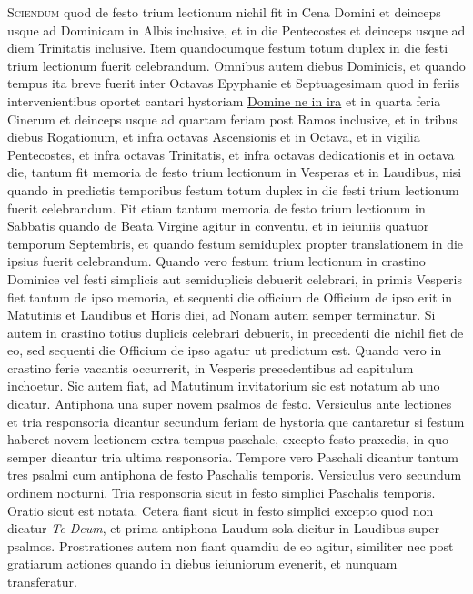 \begin{multicols*}{2}
{\color{Red} }
\lettrine[lines=2]{\zallmancaps \color{Blue} S}{ciendum} quod de festo trium lectionum nichil fit in Cena Domini et deinceps usque ad Dominicam in Albis inclusive, et in die Pentecostes et deinceps usque ad diem Trinitatis inclusive.
Item quandocumque festum totum duplex in die festi trium lectionum fuerit celebrandum.
Omnibus autem diebus Dominicis, et quando tempus ita breve fuerit inter Octavas Epyphanie et Septuagesimam quod in feriis intervenientibus oportet cantari hystoriam \hyperlink{domine-ne-in-ira}{Domine ne in ira} et in quarta feria Cinerum et deinceps usque ad quartam feriam post Ramos inclusive, et in tribus diebus Rogationum, et infra octavas Ascensionis et in Octava, et in vigilia Pentecostes, et infra octavas Trinitatis, et infra octavas dedicationis et in octava die, tantum fit memoria de festo trium lectionum in Vesperas et in Laudibus, nisi quando in predictis temporibus festum totum duplex in die festi trium lectionum fuerit celebrandum.
Fit etiam tantum memoria de festo trium lectionum in Sabbatis quando de Beata Virgine agitur in conventu, et in ieiuniis quatuor temporum Septembris, et quando festum semiduplex propter translationem in die ipsius fuerit celebrandum.
Quando vero festum trium lectionum in crastino Dominice vel festi simplicis aut semiduplicis debuerit celebrari, in primis Vesperis fiet tantum de ipso memoria, et sequenti die officium de Officium de ipso erit in Matutinis et Laudibus et Horis diei, ad Nonam autem semper terminatur.
Si autem in crastino totius duplicis celebrari debuerit, in precedenti die nichil fiet de eo, sed sequenti die Officium de ipso agatur ut predictum est.
Quando vero in crastino ferie vacantis occurrerit, in Vesperis precedentibus ad capitulum inchoetur.
Sic autem fiat, ad Matutinum invitatorium sic est notatum ab uno dicatur. Antiphona una super novem psalmos de festo. Versiculus ante lectiones et tria responsoria dicantur secundum feriam de hystoria que cantaretur si festum haberet novem lectionem extra tempus paschale, excepto festo praxedis, in quo semper dicantur tria ultima responsoria. Tempore vero Paschali dicantur tantum tres psalmi cum antiphona de festo Paschalis temporis. Versiculus vero secundum ordinem nocturni. Tria responsoria sicut in festo simplici Paschalis temporis. Oratio sicut est notata. Cetera fiant sicut in festo simplici excepto quod non dicatur \textit{Te Deum}, et prima antiphona Laudum sola dicitur in Laudibus super psalmos. Prostrationes autem non fiant quamdiu de eo agitur, similiter nec post gratiarum actiones quando in diebus ieiuniorum evenerit, et nunquam transferatur.


\end{multicols*}
